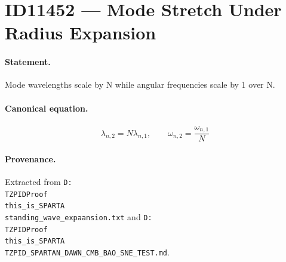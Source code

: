 \section*{ID11452 --- Mode Stretch Under Radius Expansion}

\paragraph{Statement.}
Mode wavelengths scale by N while angular frequencies scale by 1 over N.

\paragraph{Canonical equation.}
\[
\lambda_{n,2}=N\lambda_{n,1},\qquad\omega_{n,2}=\frac{\omega_{n,1}}{N}
\]

\paragraph{Provenance.}
Extracted from \texttt{D:\\TZPIDProof\\this\_is\_SPARTA\\standing\_wave\_expaansion.txt} and \texttt{D:\\TZPIDProof\\this\_is\_SPARTA\\TZPID\_SPARTAN\_DAWN\_CMB\_BAO\_SNE\_TEST.md}.
